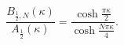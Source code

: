 \begin{equation}
\frac{B_{\frac12,N}(\kappa)}{A_{\frac12}(\kappa)}=
\frac{\cosh\frac{\pi\kappa}{2}}{\cosh\frac{N\pi\kappa}{4}}.
\end{equation}

